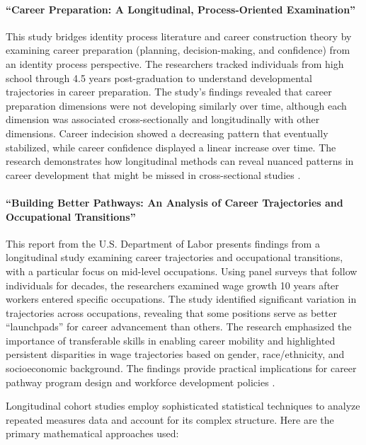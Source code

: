 \documentclass[../main.tex]{subfiles}
\begin{document}
\paragraph{``Career Preparation: A Longitudinal, Process-Oriented Examination''}
This study bridges identity process literature and career construction theory by examining career preparation (planning, decision-making, and confidence) from an identity process perspective. The researchers tracked individuals from high school through 4.5 years post-graduation to understand developmental trajectories in career preparation. The study's findings revealed that career preparation dimensions were not developing similarly over time, although each dimension was associated cross-sectionally and longitudinally with other dimensions. Career indecision showed a decreasing pattern that eventually stabilized, while career confidence displayed a linear increase over time. The research demonstrates how longitudinal methods can reveal nuanced patterns in career development that might be missed in cross-sectional studies \citep{porfeli2011career}.

\paragraph{``Building Better Pathways: An Analysis of Career Trajectories and Occupational Transitions''}
This report from the U.S. Department of Labor presents findings from a longitudinal study examining career trajectories and occupational transitions, with a particular focus on mid-level occupations. Using panel surveys that follow individuals for decades, the researchers examined wage growth 10 years after workers entered specific occupations. The study identified significant variation in trajectories across occupations, revealing that some positions serve as better ``launchpads'' for career advancement than others. The research emphasized the importance of transferable skills in enabling career mobility and highlighted persistent disparities in wage trajectories based on gender, race/ethnicity, and socioeconomic background. The findings provide practical implications for career pathway program design and workforce development policies \citep{dol2021pathways}.


Longitudinal cohort studies employ sophisticated statistical techniques to analyze repeated measures data and account for its complex structure. Here are the primary mathematical approaches used:
\end{document}
